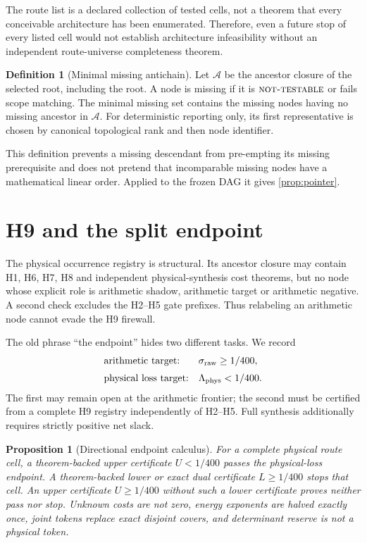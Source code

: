 \documentclass[11pt]{article}
\newtheorem{proposition}[theorem]{Proposition}
\theoremstyle{definition}
\newtheorem{definition}[theorem]{Definition}
\theoremstyle{remark}
\newcommand{\NT}{\textnormal{\textsc{not-testable}}}
\begin{document}
The route list is a declared collection of tested cells, not a theorem
that every conceivable architecture has been enumerated.  Therefore,
even a future stop of every listed cell would not establish
architecture infeasibility without an independent route-universe
completeness theorem.

\begin{definition}[Minimal missing antichain]
Let \(\mathcal A\) be the ancestor closure of the selected root,
including the root.  A node is missing if it is
\(\NT\) or fails scope matching.  The minimal missing set contains
the missing nodes having no missing ancestor in \(\mathcal A\).
For deterministic reporting only, its first representative is chosen
by canonical topological rank and then node identifier.
\end{definition}

This definition prevents a missing descendant from pre-empting its
missing prerequisite and does not pretend that incomparable missing
nodes have a mathematical linear order.  Applied to the frozen DAG it
gives \cref{prop:pointer}.

\section{H9 and the split endpoint}

The physical occurrence registry is structural.  Its ancestor closure
may contain H1, H6, H7, H8 and independent physical-synthesis cost
theorems, but no node whose explicit role is arithmetic shadow,
arithmetic target or arithmetic negative.  A second check excludes
the H2--H5 gate prefixes.  Thus relabeling an arithmetic node cannot
evade the H9 firewall.

The old phrase ``the endpoint'' hides two different tasks.  We record
\[
\begin{array}{ll}
\text{arithmetic target:}&
 \sigma_{\rm raw}\ge 1/400,\\[2mm]
\text{physical loss target:}&
 \Lambda_{\rm phys}<1/400.
\end{array}
\]
The first may remain open at the arithmetic frontier; the second must
be certified from a complete H9 registry independently of H2--H5.
Full synthesis additionally requires strictly positive net slack.

\begin{proposition}[Directional endpoint calculus]
For a complete physical route cell, a theorem-backed upper certificate
\(U<1/400\) passes the physical-loss endpoint.  A theorem-backed lower
or exact dual certificate \(L\ge1/400\) stops that cell.  An upper
certificate \(U\ge1/400\) without such a lower certificate proves
neither pass nor stop.  Unknown costs are not zero, energy exponents
are halved exactly once, joint tokens replace exact disjoint covers,
and determinant reserve is not a physical token.
\end{proposition}
\end{document}
